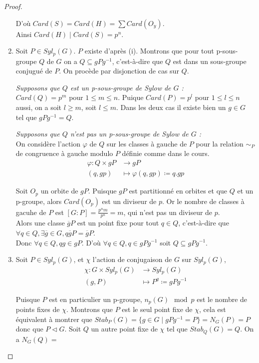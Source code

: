 \documentclass[french]{article}
\theoremstyle{definition}
\theoremstyle{plain}
\theoremstyle{plain}
\theoremstyle{plain}
\theoremstyle{plain}
\theoremstyle{plain}
\begin{document}
\begin{proof}
\begin{enumerate}[label={\upshape(\roman*)}]
D'où \( Card(S) = Card(H) = \sum Card(O_{y}) \). \\
Ainsi \( Card(H) \mid Card(S) = p^{n} \).

\item Soit \( P \in Syl_{p}({G}) \). \( P \) existe d'après (i). Montrons que pour tout p-sous-groupe \( Q \) de \( G \) on a \( Q \subseteq gPg^{-1} \), c'est-à-dire que \( Q \) est dans un sous-groupe conjugué de \( P \). On procède par disjonction de cas sur \( Q \).
	\par \textit{Supposons que \( Q \) est un p-sous-groupe de Sylow de \( G \) :}\\
	\( Card(Q) = p^{m}\) pour \( 1 \le m \le n \). Puique \( Card(P) = p^{l}\) pour 
	\( 1 \le l \le n \) aussi, on a soit \( l \ge m \), soit \( l \le m \). Dans les 
	deux cas il existe bien un \( g \in G \) tel que \( gPg^{-1} = Q \).
	
	\par \textit{Supposons que \( Q \) n'est pas un p-sous-groupe de Sylow de \( G \) :}\\ On considère l'action \( \varphi \) de \( Q \) sur les classes à gauche de \( P \) pour la relation \( \sim_{P} \) de congruence à gauche modulo \( P \) définie comme dans le cours. 
\begin{align*}
	\varphi : Q \times gP &\to gP \\
	(q,gp) &\mapsto \varphi(q,gp) \coloneq q.gp
\end{align*}

Soit \( O_{p} \) un orbite de \( gP \). Puisque \( gP \) est partitionné en orbites et que \( Q \) et un p-groupe, alors \( Card(O_{p}) \) est un diviseur de \( p \). Or le nombre de classes à gacuhe de \( P \) est \([G : P] = \frac{p^{n}m}{p^{n}} = m  \), qui n'est pas un diviseur de \( p \). \\
Alors une classe \( \overline{g}P \) est un point fixe pour tout \( q \in Q \), c'est-à-dire que \( \forall q \in Q, \exists \overline{g} \in G, q\overline{g}P = \overline{g}P \). \\
Donc \( \forall q \in Q, qg \in gP \). D'où \( \forall q \in Q, q \in gPg^{-1} \) soit \( Q \subseteq gPg^{-1} \).

\item Soit \( P \in Syl_{p}(G) \), et \( \chi \) l'action de conjugaison de \( G \) sur \( Syl_{p}(G) \),
\begin{align*}
	\chi : G \times Syl_{p}(G) &\to Syl_{p}(G) \\
	(g,P) &\mapsto P^{g} \coloneq gPg^{-1}
\end{align*}

Puisque \( P \) est en particulier un p-groupe, \( n_p(G) \mod p \) est le nombre de points fixes de \( \chi \). Montrons que \( P \) est le seul point fixe de \( \chi \), cela est équivalent à montrer que \( Stab_P(G) = \{ g \in G \mid gPg^{-1} = P \} = N_G(P) = P \) donc que \( P \triangleleft G \). Soit \( Q \) un autre point fixe de \( \chi \) tel que \( Stab_Q(G) = Q \). On a \( N_G(Q) = \)

	\end{enumerate}
\end{proof}
\end{document}
